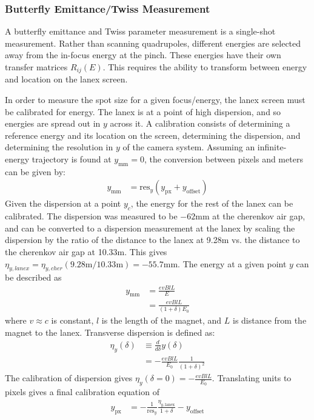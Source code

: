 \documentclass[aps,prl,twocolumn,groupedaddress]{revtex4}
\begin{document}
\subsubsection{Butterfly Emittance/Twiss Measurement}

A butterfly emittance and Twiss parameter measurement is a single-shot measurement.  Rather than scanning quadrupoles, different energies are selected away from the in-focus energy at the pinch.  These energies have their own transfer matrices $R_{ij}(E)$.  This requires the ability to transform between energy and location on the lanex screen.

In order to measure the spot size for a given focus/energy, the lanex screen must be calibrated for energy.  The lanex is at a point of high dispersion, and so energies are spread out in $y$ across it.  A calibration consists of determining a reference energy and its location on the screen, determining the dispersion, and determining the resolution in $y$ of the camera system.  Assuming an infinite-energy trajectory is found at $y_\text{mm}=0$, the conversion between pixels and meters can be given by:
\begin{align}
	y_{\text{mm}}&=\text{res}_y \left( y_\text{px} + y_\text{offset} \right)
\end{align}
Given the dispersion at a point $y_c$, the energy for the rest of the lanex can be calibrated.  The dispersion was measured to be $-62\text{mm}$ at the cherenkov air gap, and can be converted to a dispersion measurement at the lanex by scaling the dispersion by the ratio of the distance to the lanex at 9.28m vs. the distance to the cherenkov air gap at 10.33m.  This gives $\eta_{y,lanex}=\eta_{y,cher} \left( 9.28\text{m}/10.33\text{m}  \right) = -55.7\text{mm}$.  The energy at a given point $y$ can be described as
\begin{align}
	y_\text{mm} &= \frac{ e v B l L }{E} \\
	&= \frac{evBlL}{(1+\delta)E_0}
	\label{Eq:e(y)}
\end{align}
where $v\approx c$ is constant, $l$ is the length of the magnet, and $L$ is distance from the magnet to the lanex.  Transverse dispersion is defined as:
\begin{align}
	\eta_y(\delta) &\equiv \frac{d}{d\delta}y(\delta) \\
	&= -\frac{evBlL}{E_0} \frac{1}{\left( 1+\delta \right)^2}
	\label{}
\end{align}
The calibration of dispersion gives $\eta_y(\delta=0)=-\frac{evBlL}{E_0}$. Translating units to pixels gives a final calibration equation of
\begin{align}
	y_\text{px} &= -\frac{1}{\text{res}_y} \frac{\eta_{y,\text{lanex}}}{1+\delta} - y_\text{offset}
	\label{}
\end{align}
\end{document}
